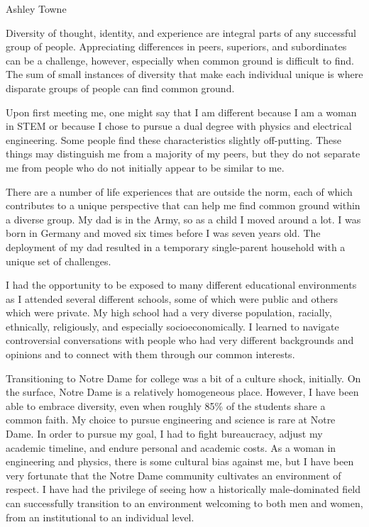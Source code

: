 \setlength{\oddsidemargin}{0in}
\setlength{\evensidemargin}{0in}
\setlength{\textwidth}{6.5in}
\setlength{\topmargin}{-.3in}
\setlength{\textheight}{9in}
\pagestyle{empty}



\begin{center}
{\large Ashley Towne}
\end{center}

\vspace*{.5in}
{Diversity of thought, identity, and experience are integral parts of any
    successful group of people. Appreciating differences in peers, superiors,
    and subordinates can be a challenge, however, especially when common ground
    is difficult to find. The sum of small instances of diversity that make
    each individual unique is where disparate groups of people can find common
    ground.

    Upon first meeting me, one might say that I am different because I am a
    woman in STEM or because I chose to pursue a dual degree with physics and
    electrical engineering. Some people find these characteristics slightly 
    off-putting. These things may distinguish me from a majority of my peers,
    but they do not separate me from people who do not initially appear to be
    similar to me.

    There are a number of life experiences that are outside the norm, each of
    which contributes to a unique perspective that can help me find common
    ground within a diverse group. My dad is in the Army, so as a child I moved
    around a lot. I was born in Germany and moved six times before I was seven
    years old. The deployment of my dad resulted in a temporary single-parent
    household with a unique set of challenges.

    I had the opportunity to be exposed to many different educational
    environments as I attended several different schools, some of which were
    public and others which were private.  My high school had a very diverse
    population, racially, ethnically, religiously, and especially
    socioeconomically. I learned to navigate controversial conversations with
    people who had very different backgrounds and opinions and to connect with
    them through our common interests.

    Transitioning to Notre Dame for college was a bit of a culture shock,
    initially. On the surface, Notre Dame is a relatively homogeneous place.
    However, I have been able to embrace diversity, even when roughly 85\% of
    the students share a common faith. My choice to pursue engineering and
    science is rare at Notre Dame. In order to pursue my goal, I had to fight
    bureaucracy, adjust my academic timeline, and endure personal and academic
    costs. As a woman in engineering and physics, there is some cultural bias
    against me, but I have been very fortunate that the Notre Dame community
    cultivates an environment of respect. I have had the privilege of seeing
    how a historically male-dominated field can successfully transition to an
    environment welcoming to both men and women, from an institutional to an
    individual level.  

}
